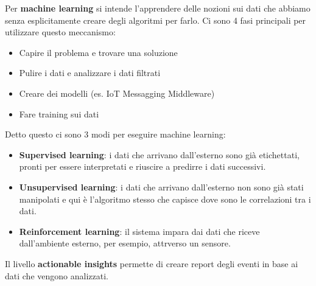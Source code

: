 \documentclass[10pt,a4paper,oneside]{scrbook}
\begin{document}
Per \textbf{machine learning} si intende l'apprendere delle nozioni sui dati che abbiamo senza esplicitamente creare degli algoritmi per farlo.
Ci sono 4 fasi principali per utilizzare questo meccanismo:
\begin{itemize}
    \item Capire il problema e trovare una soluzione
    \item Pulire i dati e analizzare i dati filtrati
    \item Creare dei modelli (es. IoT Messagging Middleware)
    \item Fare training sui dati
\end{itemize}
Detto questo ci sono 3 modi per eseguire machine learning:
\begin{itemize}
    \item \textbf{Supervised learning}: i dati che arrivano dall'esterno sono già etichettati, pronti per essere interpretati e riuscire a predirre i dati successivi.
    \item \textbf{Unsupervised learning}: i dati che arrivano dall'esterno non sono già stati manipolati e qui è l'algoritmo stesso che capisce dove sono le correlazioni tra i dati. 
    \item \textbf{Reinforcement learning}: il sistema impara dai dati che riceve dall'ambiente esterno, per esempio, attrverso un sensore.
\end{itemize}

Il livello \textbf{actionable insights} permette di creare report degli eventi in base ai dati che vengono analizzati.
\end{document}
